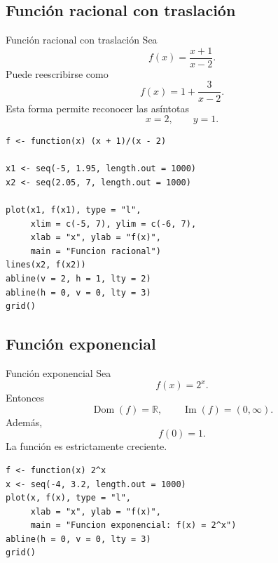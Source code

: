 \documentclass[aspectratio=169,10pt]{beamer}
\newcommand{\R}{\mathbb{R}}
\newcommand{\Dom}{\operatorname{Dom}}
\newcommand{\Ima}{\operatorname{Im}}
\begin{document}
\subsection{Función racional con traslación}
\begin{frame}{Función racional con traslación}
Sea
\[
f(x)=\frac{x+1}{x-2}.
\]
Puede reescribirse como
\[
f(x)=1+\frac{3}{x-2}.
\]
Esta forma permite reconocer las asíntotas
\[
x=2,\qquad y=1.
\]

\begin{center}
\end{center}

\begin{verbatim}
f <- function(x) (x + 1)/(x - 2)

x1 <- seq(-5, 1.95, length.out = 1000)
x2 <- seq(2.05, 7, length.out = 1000)

plot(x1, f(x1), type = "l",
     xlim = c(-5, 7), ylim = c(-6, 7),
     xlab = "x", ylab = "f(x)",
     main = "Funcion racional")
lines(x2, f(x2))
abline(v = 2, h = 1, lty = 2)
abline(h = 0, v = 0, lty = 3)
grid()
\end{verbatim}

\end{frame}
\subsection{Función exponencial}
\begin{frame}{Función exponencial}
Sea
\[
f(x)=2^x.
\]
Entonces
\[
\Dom(f)=\R,\qquad \Ima(f)=(0,\infty).
\]
Además,
\[
f(0)=1.
\]
La función es estrictamente creciente.

\begin{center}
\end{center}

\begin{verbatim}
f <- function(x) 2^x
x <- seq(-4, 3.2, length.out = 1000)
plot(x, f(x), type = "l",
     xlab = "x", ylab = "f(x)",
     main = "Funcion exponencial: f(x) = 2^x")
abline(h = 0, v = 0, lty = 3)
grid()
\end{verbatim}

\end{frame}
\end{document}
